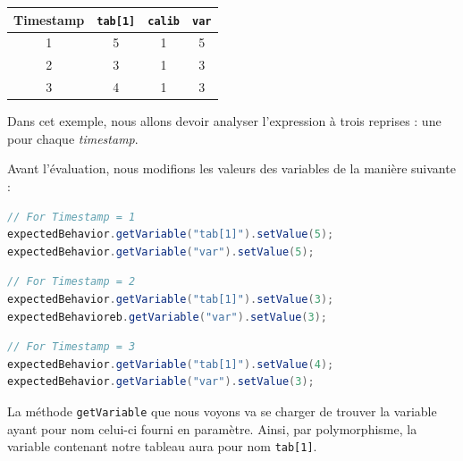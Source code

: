 \begin{exemple}
\begin{tabular}{cccc}

Timestamp & \texttt{tab[1]} & \texttt{calib} & \texttt{var}\\
\hline
1 & 5      &   1   & 5\\
2  & 3 & 1 & 3\\
3  & 4 & 1 & 3
\end{tabular}

Dans cet exemple, nous allons devoir analyser l'expression à trois reprises : une pour chaque \textit{timestamp}.

Avant l'évaluation, nous modifions les valeurs des variables de la manière suivante : 
\begin{lstlisting}[framerule=0pt,language=java, numbers=none]
// For Timestamp = 1
expectedBehavior.getVariable("tab[1]").setValue(5);
expectedBehavior.getVariable("var").setValue(5);
\end{lstlisting}

\begin{lstlisting}[framerule=0pt,language=java, numbers=none]
// For Timestamp = 2
expectedBehavior.getVariable("tab[1]").setValue(3);
expectedBehavioreb.getVariable("var").setValue(3);
\end{lstlisting}

\begin{lstlisting}[framerule=0pt,language=java, numbers=none]
// For Timestamp = 3
expectedBehavior.getVariable("tab[1]").setValue(4);
expectedBehavior.getVariable("var").setValue(3);
\end{lstlisting}

La méthode \texttt{getVariable} que nous voyons va se charger de trouver la variable ayant pour nom celui-ci fourni en paramètre. Ainsi, par polymorphisme, la variable contenant notre tableau aura pour nom \texttt{tab[1]}.
\end{exemple}

